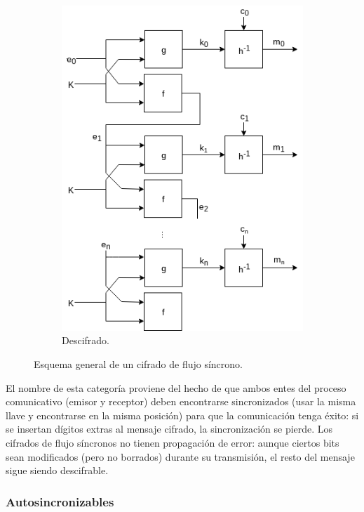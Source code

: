 \begin{figure}
\begin{subfigure}{0.45\textwidth}
\begin{center}
      \includegraphics[width=0.9\linewidth]{diagramas/sincrono_descifrado.png}
      \caption{Descifrado.}
    \end{center}
  \end{subfigure}
  \caption{Esquema general de un cifrado de flujo síncrono.}
  \label{flujo_sincrono}
\end{figure}

El nombre de esta categoría proviene del hecho de que ambos entes del proceso
comunicativo (emisor y receptor) deben encontrarse sincronizados (usar la misma
llave y encontrarse en la misma posición) para que la comunicación tenga éxito:
si se insertan dígitos extras al mensaje cifrado, la sincronización se pierde.
Los cifrados de flujo síncronos no tienen propagación de error: aunque ciertos
bits sean modificados (pero no borrados) durante su transmisión, el resto del
mensaje sigue siendo descifrable.


\subsubsection{Autosincronizables}

